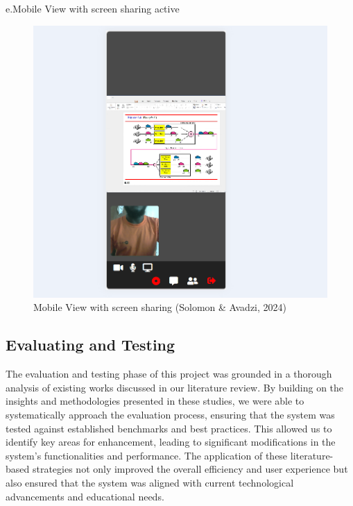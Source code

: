 \documentclass[a4paper,12pt]{article}  %
\begin{document}
e.Mobile View with screen sharing active\\
\begin{figure}[H]
      \centering
      \includegraphics[width=1\textwidth]{figures/m-screenshare-open.png}
      \caption{Mobile View with screen sharing  (Solomon \& Avadzi, 2024)}
\end{figure}

\subsection{Evaluating and Testing}
The evaluation and testing phase of this project was grounded in a thorough analysis of existing works discussed in our literature review. By building on the insights and methodologies presented in these studies, we were able to systematically approach the evaluation process, ensuring that the system was tested against established benchmarks and best practices. This allowed us to identify key areas for enhancement, leading to significant modifications in the system's functionalities and performance. The application of these literature-based strategies not only improved the overall efficiency and user experience but also ensured that the system was aligned with current technological advancements and educational needs.\\
\end{document}
